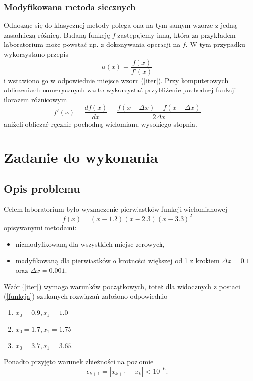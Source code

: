 \subsubsection{Modyfikowana metoda siecznych}

Odnosząc się do klasycznej metody polega ona na tym samym wzorze z jedną zasadniczą różnicą. Badaną funkcję $ f $ zastępujemy inną, która za przykładem laboratorium może powstać np. z dokonywania operacji na $ f $. W tym przypadku wykorzystano przepis:
\begin{equation}
u(x) = \frac{f(x)}{f'(x)}
\end{equation}
i wstawiono go w odpowiednie miejsce wzoru (\ref{iter}). Przy komputerowych obliczeniach numerycznych warto wykorzystać przybliżenie pochodnej funkcji ilorazem różnicowym
\begin{equation}
f'(x) = \frac{df(x)}{dx} = \frac{f(x + \Delta x) - f(x - \Delta x)}{2\Delta x}
\end{equation}
aniżeli obliczać ręcznie pochodną wielomianu wysokiego stopnia.

\newpage
\section{Zadanie do wykonania}

\subsection{Opis problemu}

Celem laboratorium było wyznaczenie pierwiastków funkcji wielomianowej 
\begin{equation}
f(x) = (x-1.2)(x-2.3)(x-3.3)^2
\label{funkcja}
\end{equation}
opisywanymi metodami: 
\begin{itemize}
	\item niemodyfikowaną dla wszystkich miejsc zerowych,
	\item modyfikowaną dla pierwiastków o krotności większej od 1 z krokiem $ \Delta x = 0.1 $ oraz $ \Delta x = 0.001 $. 
\end{itemize}
Wzór (\ref{iter}) wymaga warunków początkowych, toteż dla widocznych z postaci (\ref{funkcja}) szukanych rozwiązań założono odpowiednio
\begin{enumerate}
	\item $ x_0 = 0.9, x_1 = 1.0 $
	\item $ x_0 = 1.7, x_1 = 1.75 $
	\item $ x_0 = 3.7, x_1 = 3.65 $.
\end{enumerate}
Ponadto przyjęto warunek zbieżności na poziomie 
\begin{equation}
\epsilon_{k+1} = |x_{k+1} - x_k| < 10^{-6}.
\end{equation}



